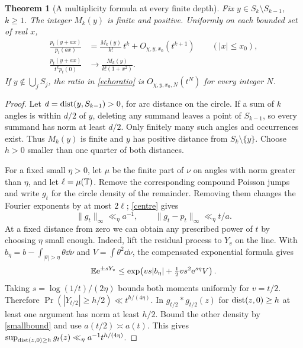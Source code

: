 \documentclass[11pt,letterpaper]{article}
\theoremstyle{plain}
\newtheorem{theorem}{Theorem}[section]\newtheorem{lemma}[theorem]{Lemma}
\theoremstyle{definition}\newtheorem{example}[theorem]{Example}
\begin{document}
\begin{theorem}[A multiplicity formula at every finite depth]\label{echo}
Fix $y\in S_k\setminus S_{k-1}$, $k\ge1$. The integer $M_k(y)$ is finite and positive. Uniformly on each bounded set of real $x$,
\begin{align}
 \frac{p_t(y+a x)}{p_t(a x)}
   &=\frac{M_k(y)}{k!}\,t^k+O_{\chi,y,x_0}(t^{k+1})\qquad(|x|\le x_0),\label{echoratio}\\
 \frac{p_t(y+a x)}{t^kp_t(0)}
   &\longrightarrow \frac{M_k(y)}{k!(1+x^2)} .\label{echoprof}
\end{align}
If $y\notin\bigcup_jS_j$, the ratio in \eqref{echoratio} is $O_{\chi,y,x_0,N}(t^N)$ for every integer $N$.
\end{theorem}
\begin{proof}
Let $d=\operatorname{dist}(y,S_{k-1})>0$, for arc distance on the circle. If a sum of $k$ angles is within $d/2$ of $y$, deleting any summand leaves a point of $S_{k-1}$, so every summand has norm at least $d/2$. Only finitely many such angles and occurrences exist. Thus $M_k(y)$ is finite and $y$ has positive distance from $S_k\setminus\{y\}$. Choose $h>0$ smaller than one quarter of both distances.

For a fixed small $\eta>0$, let $\mu$ be the finite part of $\nu$ on angles with norm greater than $\eta$, and let $\ell=\mu(\mathbb T)$. Remove the corresponding compound Poisson jumps and write $g_t$ for the circle density of the remainder. Removing them changes the Fourier exponents by at most $2\ell$; \eqref{centre} gives
\begin{equation}\label{smallbound}
 \|g_t\|_\infty\ll_\eta a^{-1},\qquad
 \|g_t-p_t\|_\infty\ll_\eta t/a .
\end{equation}
At a fixed distance from zero we can obtain any prescribed power of $t$ by choosing $\eta$ small enough. Indeed, lift the residual process to $Y_v$ on the line. With $b_\eta=b-\int_{|\theta|>\eta}\theta\dd\nu$ and $V=\int\theta^2\dd\nu$, the compensated exponential formula gives
\[
 \mathbb E\mathrm e^{\pm sY_v}
 \le\exp\!\left(vs|b_\eta|+\tfrac12 v s^2\mathrm e^{s\eta}V\right).
\]
Taking $s=\log(1/t)/(2\eta)$ bounds both moments uniformly for $v=t/2$. Therefore $\Pr(|Y_{t/2}|\ge h/2)\ll t^{h/(4\eta)}$. In $g_{t/2}*g_{t/2}(z)$ for $\operatorname{dist}(z,0)\ge h$ at least one argument has norm at least $h/2$. Bound the other density by \eqref{smallbound} and use $a(t/2)\asymp a(t)$. This gives $\sup_{\operatorname{dist}(z,0)\ge h}g_t(z)\ll_\eta a^{-1}t^{h/(4\eta)}$.


\end{proof}
\end{document}
